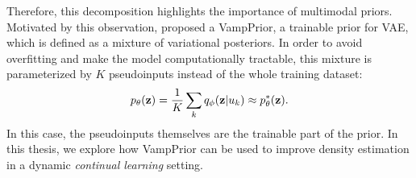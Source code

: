 Therefore, this decomposition highlights the importance of multimodal priors. 
Motivated by this observation, \citet{tomczak2018vae} proposed a VampPrior, a trainable prior for VAE, which is defined as a mixture of variational posteriors. In order to avoid overfitting and make the model computationally tractable, this mixture is parameterized by $K$ pseudoinputs instead of the whole training dataset:
\begin{equation}
    p_{\theta}({\mathbf{z}}) = \frac1K \sum_k q_{\phi}({\mathbf{z}}|u_k) \approx p_{\theta}^*({\mathbf{z}}).
\end{equation}
In this case, the pseudoinputs themselves are the trainable part of the prior. In this thesis, we explore how VampPrior can be used to improve density estimation in a dynamic \textit{continual learning} setting. 


